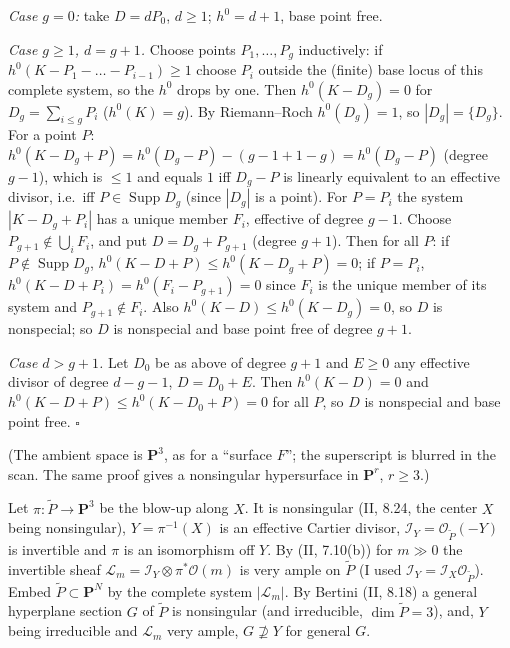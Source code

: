 \documentclass[11pt]{article}
\begin{document}
\emph{Case $g=0$:} take $D=dP_0$, $d\ge1$; $h^0=d+1$, base point free.

\emph{Case $g\ge1$, $d=g+1$.} Choose points $P_1,\dots,P_g$ inductively: if $h^0(K-P_1-\dots-P_{i-1})\ge1$ choose $P_i$ outside the (finite) base locus of this complete system, so the $h^0$ drops by one. Then $h^0(K-D_g)=0$ for $D_g=\sum_{i\le g}P_i$ ($h^0(K)=g$). By Riemann--Roch $h^0(D_g)=1$, so $|D_g|=\{D_g\}$. For a point $P$: $h^0(K-D_g+P)=h^0(D_g-P)-(g-1+1-g)=h^0(D_g-P)$ (degree $g-1$), which is $\le1$ and equals $1$ iff $D_g-P$ is linearly equivalent to an effective divisor, i.e.\ iff $P\in\operatorname{Supp}D_g$ (since $|D_g|$ is a point). For $P=P_i$ the system $|K-D_g+P_i|$ has a unique member $F_i$, effective of degree $g-1$. Choose $P_{g+1}\notin\bigcup_iF_i$, and put $D=D_g+P_{g+1}$ (degree $g+1$). Then for all $P$: if $P\notin\operatorname{Supp}D_g$, $h^0(K-D+P)\le h^0(K-D_g+P)=0$; if $P=P_i$, $h^0(K-D+P_i)=h^0(F_i-P_{g+1})=0$ since $F_i$ is the unique member of its system and $P_{g+1}\notin F_i$. Also $h^0(K-D)\le h^0(K-D_g)=0$, so $D$ is nonspecial; so $D$ is nonspecial and base point free of degree $g+1$.

\emph{Case $d>g+1$.} Let $D_0$ be as above of degree $g+1$ and $E\ge0$ any effective divisor of degree $d-g-1$, $D=D_0+E$. Then $h^0(K-D)=0$ and $h^0(K-D+P)\le h^0(K-D_0+P)=0$ for all $P$, so $D$ is nonspecial and base point free. \hfill$\square$

\pf
(The ambient space is $\mathbf P^3$, as for a ``surface $F$''; the superscript is blurred in the scan. The same proof gives a nonsingular hypersurface in $\mathbf P^r$, $r\ge3$.)

Let $\pi:\tilde P\to\mathbf P^3$ be the blow-up along $X$. It is nonsingular (II, 8.24, the center $X$ being nonsingular), $Y=\pi^{-1}(X)$ is an effective Cartier divisor, $\mathcal I_Y=\mathcal O_{\tilde P}(-Y)$ is invertible and $\pi$ is an isomorphism off $Y$. By (II, 7.10(b)) for $m\gg0$ the invertible sheaf $\mathcal L_m=\mathcal I_Y\otimes\pi^*\mathcal O(m)$ is very ample on $\tilde P$ (I used $\mathcal I_Y=\mathcal I_X\mathcal O_{\tilde P}$). Embed $\tilde P\subset\mathbf P^N$ by the complete system $|\mathcal L_m|$. By Bertini (II, 8.18) a general hyperplane section $G$ of $\tilde P$ is nonsingular (and irreducible, $\dim\tilde P=3$), and, $Y$ being irreducible and $\mathcal L_m$ very ample, $G\not\supseteq Y$ for general $G$.
\end{document}
